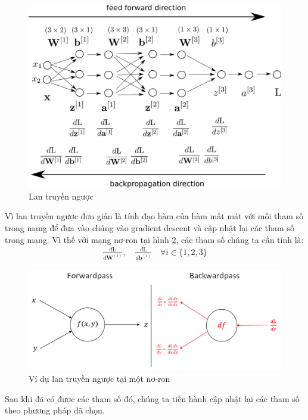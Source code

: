 \begin{center}
 	\begin{figure}[H]
    \begin{center}
     \includegraphics[scale=0.5]{chap3/image/backpropagationdirection.png}
    \end{center}
    \caption{Lan truyền ngược}
    \label{fig:backpropagationdirection}
    \end{figure}
\end{center}
Vì lan truyền ngược đơn giản là tính đạo hàm của hàm mất mát với mỗi tham số trong mạng để đưa vào chúng vào gradient descent và cập nhật lại các tham số trong mạng. Vì thế với mạng nơ-ron tại hình \ref{fig:backpropagationdirection}, các tham số chúng ta cần tính là:
\begin{align*}
\frac{d \text{L}}{d \mathbf{W}^{(i)}}, \quad \frac{d \text{L}}{d \mathbf{b}^{(i)}} \quad \forall i \in \{1,2,3\}
\end{align*}
\begin{center}
 	\begin{figure}[H]
    \begin{center}
     \includegraphics[scale=0.5]{chap3/image/backpropagation_3.png}
    \end{center}
    \caption{Ví dụ lan truyền ngược tại một nơ-ron}
    \label{fig:backpropagationdirection}
    \end{figure}
\end{center}
Sau khi đã có được các tham số đó, chúng ta tiến hành cập nhật lại các tham số theo phương pháp đã chọn.

